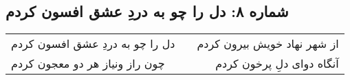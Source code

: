 \begin{center}
\section*{شماره ۸: دل را چو به دردِ عشق افسون کردم}
\label{sec:008}
\begin{longtable}{l p{0.5cm} r}
دل را چو به دردِ عشق افسون کردم
&&
از شهر نهاد خویش بیرون کردم
\\
چون راز ونیاز هر دو معجون کردم
&&
آنگاه دوای دلِ پرخون کردم
\\
\end{longtable}
\end{center}

